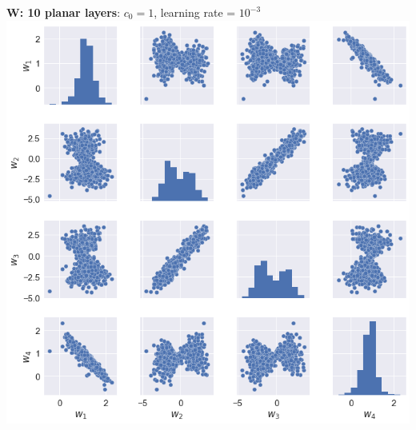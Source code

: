\documentclass[11pt]{article}
\begin{document}
\clearpage
\begin{center}
\textbf{W: 10 planar layers}: $c_0 = 1$, learning rate = $10^{-3}$ \\
\includegraphics[scale=.45]{images/learnW_samples.png} \\
\end{center}
\end{document}
